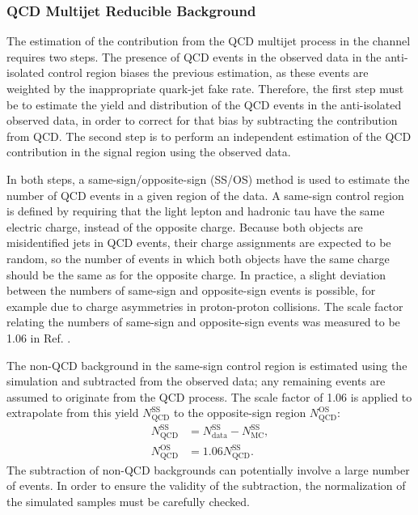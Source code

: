 \subsubsection{QCD Multijet Reducible Background}
\label{sec:qcdbkg}

The estimation of the contribution from the QCD multijet process in the \etau channel requires two steps. The presence of QCD events in the observed data in the \etau anti-isolated control region biases the previous estimation, as these events are weighted by the inappropriate quark-jet fake rate. Therefore, the first step must be to estimate the yield and \pt distribution of the QCD events in the anti-isolated observed data, in order to correct for that bias by subtracting the contribution from QCD. The second step is to perform an independent estimation of the QCD contribution in the signal region using the observed data.

In both steps, a same-sign/opposite-sign (SS/OS) method is used to estimate the number of QCD events in a given region of the data. A same-sign control region is defined by requiring that the light lepton and hadronic tau have the same electric charge, instead of the opposite charge. Because both objects are misidentified jets in QCD events, their charge assignments are expected to be random, so the number of events in which both objects have the same charge should be the same as for the opposite charge. In practice, a slight deviation between the numbers of same-sign and opposite-sign events is possible, for example due to charge asymmetries in proton-proton collisions. The scale factor relating the numbers of same-sign and opposite-sign events was measured to be 1.06 in Ref. \cite{CMS-AN-2013-178}.

The non-QCD background in the same-sign control region is estimated using the simulation and subtracted from the observed data; any remaining events are assumed to originate from the QCD process. The scale factor of 1.06 is applied to extrapolate from this yield $N_{\text{QCD}}^{\text{SS}}$ to the opposite-sign region $N_{\text{QCD}}^{\text{OS}}$:
\begin{align}
N_{\text{QCD}}^{\text{SS}} & = N_{\text{data}}^{\text{SS}} - N_{\text{MC}}^{\text{SS}}, \label{bkg:QCDss}\\
N_{\text{QCD}}^{\text{OS}} & = 1.06 N_{\text{QCD}}^{\text{SS}}. \label{bkg:QCDos}
\end{align}
The subtraction of non-QCD backgrounds can potentially involve a large number of events. In order to ensure the validity of the subtraction, the normalization of the simulated samples must be carefully checked.

